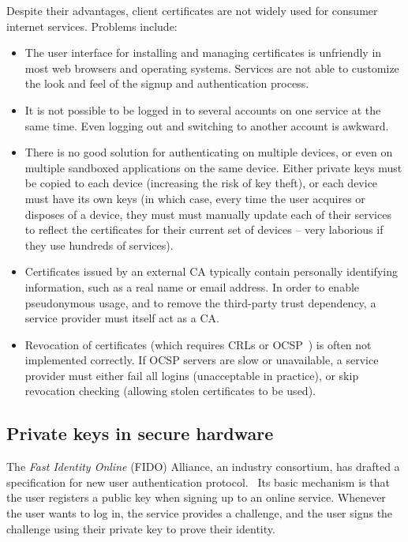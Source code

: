 Despite their advantages, client certificates are not widely used for consumer internet services.
Problems include:
\begin{itemize}
\item The user interface for installing and managing certificates is unfriendly in most web
browsers and operating systems. Services are not able to customize the look and feel of the signup
and authentication process.
\item It is not possible to be logged in to several accounts on one service at the same time. Even
logging out and switching to another account is awkward.
\item There is no good solution for authenticating on multiple devices, or even on multiple
sandboxed applications on the same device. Either private keys must be copied to each device
(increasing the risk of key theft), or each device must have its own keys (in which case, every time
the user acquires or disposes of a device, they must must manually update each of their services to
reflect the certificates for their current set of devices -- very laborious if they use hundreds of
services).
\item Certificates issued by an external CA typically contain personally identifying information,
such as a real name or email address. In order to enable pseudonymous usage, and to remove the
third-party trust dependency, a service provider must itself act as a CA.
\item Revocation of certificates (which requires CRLs or OCSP~\cite{OCSP}) is often not implemented
correctly. If OCSP servers are slow or unavailable, a service provider must either fail all logins
(unacceptable in practice), or skip revocation checking (allowing stolen certificates to be used).
\end{itemize}

\subsection{Private keys in secure hardware}\label{sec:hardware}

The \emph{Fast Identity Online} (FIDO) Alliance, an industry consortium, has drafted a specification
for new user authentication protocol.~\cite{FIDOOverview, FIDOSpec} Its basic mechanism is that the
user registers a public key when signing up to an online service. Whenever the user wants to log in,
the service provides a challenge, and the user signs the challenge using their private key to prove
their identity.

